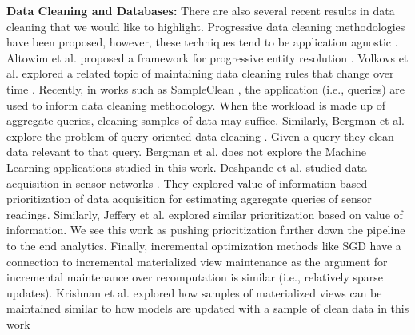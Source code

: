\noindent \textbf{Data Cleaning and Databases: } There are also several recent results in data cleaning that we would like to highlight. 
Progressive data cleaning methodologies have been proposed, however, these techniques tend to be application agnostic \cite{mayfield2010eracer}.
Altowim et al. proposed a framework for progressive entity resolution \cite{altowim2014progressive}. 
Volkovs et al. explored a related topic of maintaining data cleaning rules that change over time \cite{volkovs2014continuous}. 
Recently, in works such as SampleClean \cite{wang1999sample}, the application (i.e., queries) are used to inform data cleaning methodology.
When the workload is made up of aggregate queries, cleaning samples of data may suffice. 
Similarly, Bergman et al. explore the problem of query-oriented data cleaning \cite{bergman2015query}. Given a query they clean data relevant to that query. 
Bergman et al. does not explore the Machine Learning applications studied in this work.
Deshpande et al. studied data acquisition in sensor networks \cite{deshpande2004model}. They explored value of information based prioritization of data acquisition for estimating aggregate queries of sensor readings.
Similarly, Jeffery et al. \cite{DBLP:conf/pervasive/JefferyAFHW06} explored similar prioritization based on value of information.
We see this work as pushing prioritization further down the pipeline to the end analytics.
Finally, incremental optimization methods like SGD have a connection to incremental materialized view maintenance as the argument for incremental maintenance over recomputation is similar (i.e., relatively sparse updates).
Krishnan et al. explored how samples of materialized views can be maintained similar to how models are updated with a sample of clean data in this work \cite{krishnan2015svc}




